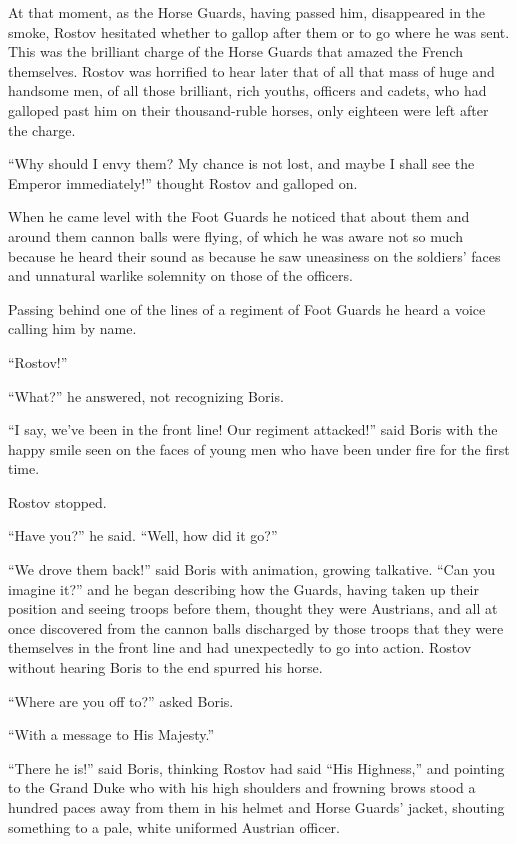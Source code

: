 At that moment, as the Horse Guards, having passed him,
disappeared in the smoke, Rostov hesitated whether to gallop
after them or to go where he was sent. This was the brilliant
charge of the Horse Guards that amazed the French
themselves. Rostov was horrified to hear later that of all that
mass of huge and handsome men, of all those brilliant, rich
youths, officers and cadets, who had galloped past him on their
thousand-ruble horses, only eighteen were left after the charge.

``Why should I envy them? My chance is not lost, and maybe I
shall see the Emperor immediately!'' thought Rostov and galloped
on.

When he came level with the Foot Guards he noticed that about
them and around them cannon balls were flying, of which he was
aware not so much because he heard their sound as because he saw
uneasiness on the soldiers' faces and unnatural warlike solemnity
on those of the officers.

Passing behind one of the lines of a regiment of Foot Guards he
heard a voice calling him by name.

``Rostov!''

``What?'' he answered, not recognizing Boris.

``I say, we've been in the front line! Our regiment attacked!''
said Boris with the happy smile seen on the faces of young men
who have been under fire for the first time.

Rostov stopped.

``Have you?'' he said. ``Well, how did it go?''

``We drove them back!'' said Boris with animation, growing
talkative. ``Can you imagine it?'' and he began describing how
the Guards, having taken up their position and seeing troops
before them, thought they were Austrians, and all at once
discovered from the cannon balls discharged by those troops that
they were themselves in the front line and had unexpectedly to go
into action. Rostov without hearing Boris to the end spurred his
horse.

``Where are you off to?'' asked Boris.

``With a message to His Majesty.''

``There he is!'' said Boris, thinking Rostov had said ``His
Highness,'' and pointing to the Grand Duke who with his high
shoulders and frowning brows stood a hundred paces away from them
in his helmet and Horse Guards' jacket, shouting something to a
pale, white uniformed Austrian officer.

